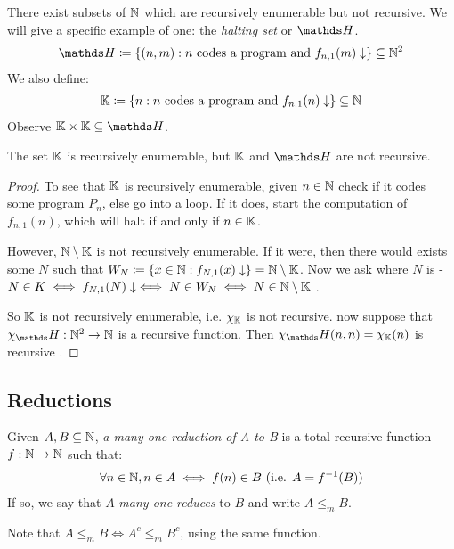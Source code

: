 \documentclass[10pt,a4paper]{article}
\begin{document}
There exist subsets of $\mathbb{N}$ which are recursively enumerable but not recursive. We will give a specific example of one: the \emph{halting set} or $\H$.
\begin{align*}
\H \coloneqq \left\{ (n,m) : n \text{ codes a program and } f_{n,1}(m)\downarrow \right\} \subseteq \N^2
\end{align*}
We also define:
\begin{align*}
\mathbb{K} \coloneqq \left\{ n : n \text{ codes a program and } f_{n,1}(n)\downarrow \right\} \subseteq \mathbb{N}
\end{align*}
Observe $\K\times \K \subseteq \H$.
\begin{theorem}
The set $\mathbb{K}$ is recursively enumerable, but $\mathbb{K}$ and $\H$ are not recursive.
\end{theorem}
\begin{proof}
To see that $\mathbb{K}$ is recursively enumerable, given $n\in\mathbb{N}$ check if it codes some program $P_n$, else go into a loop. If it does, start the computation of $f_{n,1}(n)$, which will halt if and only if $n \in \mathbb{K}$.

However, $\mathbb{N}\setminus \mathbb{K}$ is not recursively enumerable. If it were, then there would exists some $N$ such that $W_N \coloneqq \{x\in \mathbb{N} : f_{N,1}(x)\downarrow\} = \mathbb{N}\setminus \mathbb{K}$. Now we ask where $N$ is - $N \in K \iff f_{N,1}(N)\downarrow \iff N \in W_N \iff N \in \mathbb{N} \setminus \mathbb{K}$ \contr.

So $\mathbb{K}$ is not recursively enumerable, i.e. $\chi_{\mathbb{K}}$ is not recursive. now suppose that $\chi_\H : \N^2 \to \N$ is a recursive function. Then $\chi_\H(n,n) = \chi_\K(n)$ is recursive \contr.
\end{proof}
\subsection*{Reductions}
Given $A, B \subseteq \mathbb{N}$, \emph{a many-one reduction of A to B} is a total recursive function $f:\mathbb{N} \to \mathbb{N}$ such that:
\begin{align*}
\forall n \in \mathbb{N}, n \in A \iff f(n) \in B \text{ (i.e. $A = f^{-1}(B)$)}
\end{align*}
If so, we say that $A$ \emph{many-one reduces} to $B$ and write $A \leq_m B$.

Note that $A\leq_m B \iff A^c \leq_m B^c$, using the same function.
\end{document}
